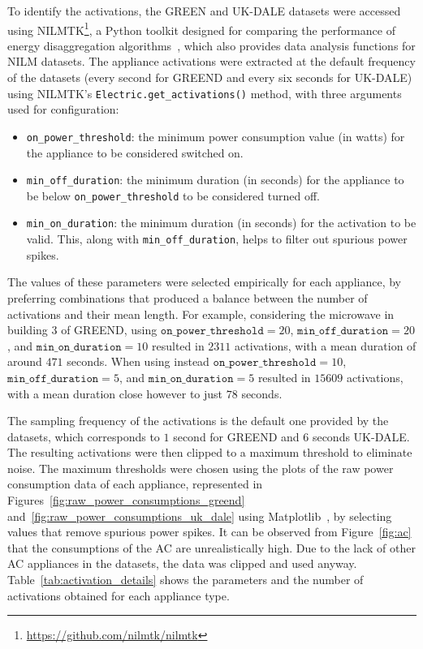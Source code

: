 To identify the activations, the GREEN and UK-DALE datasets were accessed using NILMTK\footnote{\url{https://github.com/nilmtk/nilmtk}}, a Python toolkit designed for comparing the performance of energy disaggregation algorithms~\parencite{batraItDifferentInsights2013}, which also provides data analysis functions for NILM datasets. The appliance activations were extracted at the default frequency of the datasets (every second for GREEND and every six seconds for UK-DALE) using NILMTK's \texttt{Electric.get\_activations()} method, with three arguments used for configuration:
\begin{itemize}
  \item \texttt{on\_power\_threshold}: the minimum power consumption value (in watts) for the appliance to be considered switched on.
  \item \texttt{min\_off\_duration}: the minimum duration (in seconds) for the appliance to be below \texttt{on\_power\_threshold} to be considered turned off.
  \item \texttt{min\_on\_duration}: the minimum duration (in seconds) for the activation to be valid. This, along with \texttt{min\_off\_duration}, helps to filter out spurious power spikes.
\end{itemize}
The values of these parameters were selected empirically for each appliance, by preferring combinations that produced a balance between the number of activations and their mean length. For example, considering the microwave in building 3 of GREEND, using $\texttt{on\_power\_threshold} = 20$, $\texttt{min\_off\_duration} = 20$, and $\texttt{min\_on\_duration} = 10$ resulted in $2311$ activations, with a mean duration of around $471$ seconds. When using instead $\texttt{on\_power\_threshold} = 10$, $\texttt{min\_off\_duration} = 5$, and $\texttt{min\_on\_duration} = 5$ resulted in $15609$ activations, with a mean duration close however to just $78$ seconds.

The sampling frequency of the activations is the default one provided by the datasets, which corresponds to $1$ second for GREEND and $6$ seconds UK-DALE. The resulting activations were then clipped to a maximum threshold to eliminate noise. The maximum thresholds were chosen using the plots of the raw power consumption data of each appliance, represented in Figures~\ref{fig:raw_power_consumptions_greend} and~\ref{fig:raw_power_consumptions_uk_dale} using Matplotlib~\parencite{hunterMatplotlib2DGraphics2007}, by selecting values that remove spurious power spikes. It can be observed from Figure~\ref{fig:ac} that the consumptions of the AC are unrealistically high. Due to the lack of other AC appliances in the datasets, the data was clipped and used anyway. Table~\ref{tab:activation_details} shows the parameters and the number of activations obtained for each appliance type.

